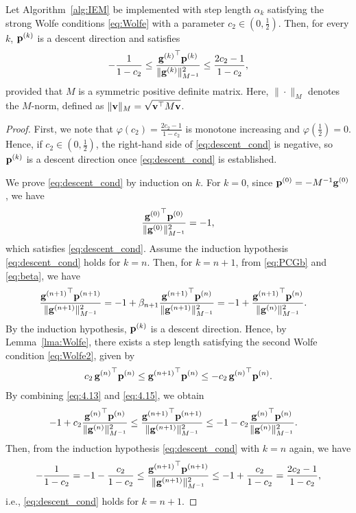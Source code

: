 \documentclass[11pt,a4paper]{article}
\begin{document}
\begin{lemma}
\label{lma:descent} 
Let Algorithm~\ref{alg:IEM} be implemented with step length $\alpha_k$ satisfying the strong Wolfe conditions \eqref{eq:Wolfe} with a parameter $ c_2 \in (0, \frac{1}{2})$. 
Then, for every $k$, $\mathbf{p}^{(k)}$ is a descent direction and satisfies
\begin{equation} \label{eq:descent_cond}
-\frac{1}{1-c_2} \leq \frac{{\mathbf{g}^{(k)}}^{\top} \mathbf{p}^{(k)}}{\| \mathbf{g}^{(k)} \|^2_{M^{-1}}} \leq \frac{2c_2 - 1}{1 - c_2},
\end{equation}
provided that $M$ is a symmetric positive definite matrix. Here, $\|\cdot\|_{M}$ denotes the $M$-norm, defined as $\|\mathbf{v}\|_{M} = \sqrt{\mathbf{v}^\top M\mathbf{v}}$.
\end{lemma}

\begin{proof}
First, we note that $\varphi(c_2) = \frac{2c_2 - 1}{1 - c_2}$ is monotone increasing and $\varphi(\frac{1}{2}) = 0$. Hence, if $c_2 \in (0, \frac{1}{2})$, the right-hand side of \eqref{eq:descent_cond} is negative, so $\mathbf{p}^{(k)}$ is a descent direction once \eqref{eq:descent_cond} is established.

We prove \eqref{eq:descent_cond} by induction on $k$. 
For $k = 0$, since $\mathbf{p}^{(0)} = - M^{-1} \mathbf{g}^{(0)}$, we have 
$$\frac{{\mathbf{g}^{(0)}}^{\top} \mathbf{p}^{(0)}}{\| {\mathbf{g}^{(0)}} \|^2_{M^{-1}}} = -1,$$ 
which satisfies \eqref{eq:descent_cond}. 
Assume the induction hypothesis \eqref{eq:descent_cond} holds for $k=n$. 
Then, for $k = n + 1$, from \eqref{eq:PCGb} and \eqref{eq:beta}, we have
\begin{align}
\frac{{\mathbf{g}^{(n+1)}}^{\top} \mathbf{p}^{(n+1)}}{\| {\mathbf{g}^{(n+1)}} \|^2_{M^{-1}}} 
&= -1 + \beta_{n+1} \frac{{\mathbf{g}^{(n+1)}}^{\top} \mathbf{p}^{(n)}}{\| {\mathbf{g}^{(n+1)}} \|^2_{M^{-1}}} 
= -1 + \frac{{\mathbf{g}^{(n+1)}}^{\top} \mathbf{p}^{(n)}}{\| {\mathbf{g}^{(n)}} \|^2_{M^{-1}}}. \label{eq:4.13} 
\end{align}
By the induction hypothesis, $\mathbf{p}^{(k)}$ is a descent direction. Hence, by Lemma~\ref{lma:Wolfe}, there exists a step length satisfying the second Wolfe condition \eqref{eq:Wolfe2}, given by
\begin{align}
c_2 \, {\mathbf{g}^{(n)}}^{\top} \mathbf{p}^{(n)} \leq {\mathbf{g}^{(n+1)}}^{\top} \mathbf{p}^{(n)} \leq -c_2 \, {\mathbf{g}^{(n)}}^{\top} \mathbf{p}^{(n)}. \label{eq:4.15} 
\end{align}
By combining \eqref{eq:4.13} and \eqref{eq:4.15}, we obtain
\begin{align*}
-1 + c_2\frac{{\mathbf{g}^{(n)}}^\top \mathbf{p}^{(n)}}{\| {\mathbf{g}^{(n)}} \|^2_{M^{-1}}}
&\leq \frac{{\mathbf{g}^{(n+1)}}^\top \mathbf{p}^{(n+1)}}{\| {\mathbf{g}^{(n+1)}} \|^2_{M^{-1}}} 
\leq -1 - c_2\frac{{\mathbf{g}^{(n)}}^{\top} \mathbf{p}^{(n)}}{\| {\mathbf{g}^{(n)}} \|^2_{M^{-1}}}.
\end{align*}
Then, from the induction hypothesis \eqref{eq:descent_cond} with $k = n$ again, we have
\begin{equation*}
-\frac{1}{1-c_2} = -1 - \frac{c_2}{1-c_2} \leq \frac{{\mathbf{g}^{(n+1)}}^{\top} \mathbf{p}^{(n+1)}}{\| \mathbf{g}^{(n+1)} \|^2_{M^{-1}}} \leq -1 + \frac{c_2}{1-c_2} = \frac{2c_2 - 1}{1 - c_2}, 
\end{equation*}
i.e., \eqref{eq:descent_cond} holds for $k=n+1$.
\end{proof}
\end{document}
